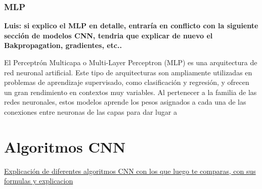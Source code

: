 \documentclass{uathesis-es}
\begin{document}
\subsubsection*{MLP}

\textbf{Luis: si explico el MLP en detalle, entraría en conflicto con la siguiente sección de modelos CNN, tendria que explicar de nuevo el Bakpropagation, gradientes, etc..}

El Perceptrón Multicapa o Multi-Layer Perceptron (MLP) es una arquitectura de red neuronal artificial. Este tipo de arquitecturas son ampliamente utilizadas en problemas de aprendizaje supervisado, como clasificación y regresión, y ofrecen un gran rendimiento en contextos muy variables. Al pertenecer a la familia de las redes neuronales, estos modelos aprende los pesos asignados a cada una de las conexiones entre neuronas de las capas para dar lugar a 








\section{Algoritmos CNN}

\underline{Explicación de diferentes algoritmos CNN con los que luego te comparas, con sus formulas y explicacion}
\end{document}
